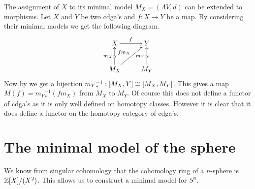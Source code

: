 The assignment of $X$ to its minimal model $M_X = (\Lambda V, d)$ can be extended to morphisms. Let $X$ and $Y$ be two cdga's and $f: X \to Y$ be a map. By considering their minimal models we get the following diagram.
\begin{displaymath}
	\xymatrix{
	X \ar[r]^f & Y \\
	M_X \arwe[u]^{m_X} \ar[ur]^{f m_X} & M_Y \arwe[u]^{m_Y}
	}
\end{displaymath}
Now by  we get a bijection ${m_Y}_\ast^{-1} : [M_X, Y] \cong [M_X, M_Y]$. This gives a map $M(f) = {m_Y}_\ast^{-1} (f m_X)$ from $M_X$ to $M_Y$. Of course this does not define a functor of cdga's as it is only well defined on homotopy classes. However it is clear that it does define a functor on the homotopy category of cdga's.


\section{The minimal model of the sphere}
We know from singular cohomology that the cohomology ring of a $n$-sphere is $\mathbb{Z}[X] / (X^2)$. This allows us to construct a minimal model for $S^n$.

